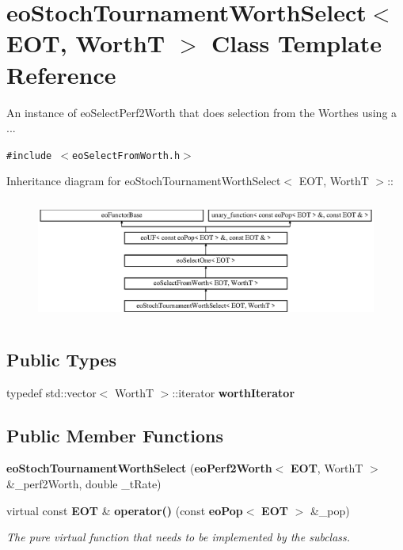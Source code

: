 \section{eo\-Stoch\-Tournament\-Worth\-Select$<$ EOT, Worth\-T $>$ Class Template Reference}
\label{classeo_stoch_tournament_worth_select}
An instance of eo\-Select\-Perf2Worth that does selection from the Worthes using a ...  


{\tt \#include $<$eo\-Select\-From\-Worth.h$>$}

Inheritance diagram for eo\-Stoch\-Tournament\-Worth\-Select$<$ EOT, Worth\-T $>$::\begin{figure}[H]
\begin{center}
\leavevmode
\includegraphics[height=4.04624cm]{classeo_stoch_tournament_worth_select}
\end{center}
\end{figure}
\subsection*{Public Types}
\begin{CompactItemize}
\item 
typedef std::vector$<$ Worth\-T $>$::iterator {\bf worth\-Iterator}\label{classeo_stoch_tournament_worth_select_w0}

\end{CompactItemize}
\subsection*{Public Member Functions}
\begin{CompactItemize}
\item 
{\bf eo\-Stoch\-Tournament\-Worth\-Select} ({\bf eo\-Perf2Worth}$<$ {\bf EOT}, Worth\-T $>$ \&\_\-perf2Worth, double \_\-t\-Rate)\label{classeo_stoch_tournament_worth_select_a0}

\item 
virtual const {\bf EOT} \& {\bf operator()} (const {\bf eo\-Pop}$<$ {\bf EOT} $>$ \&\_\-pop)\label{classeo_stoch_tournament_worth_select_a1}

\begin{CompactList}\small\item\em The pure virtual function that needs to be implemented by the subclass. \item\end{CompactList}\end{CompactItemize}
